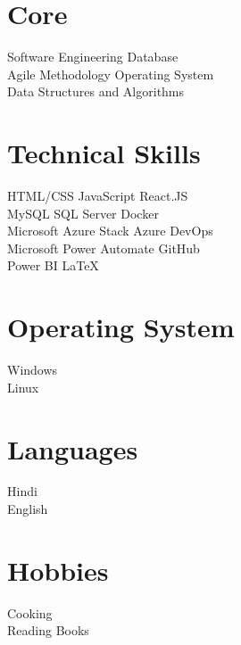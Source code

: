 \documentclass[]{deedy-resume-openfont}
\begin{document}
\begin{minipage}[t]{0.33\textwidth}

\section{Core}
\textbullet{} Software Engineering  \textbullet{} Database\\ \textbullet{}  Agile Methodology  \textbullet{} Operating System\\ \textbullet{} Data Structures and Algorithms
\sectionsep


\section{Technical Skills}
 \textbullet{} HTML/CSS \textbullet{} JavaScript \textbullet{} React.JS \\
 \textbullet{} MySQL \textbullet{} SQL Server \textbullet{} Docker\\
 \textbullet{} Microsoft Azure Stack \textbullet{} Azure DevOps  \\
 \textbullet{} Microsoft Power Automate \textbullet{} GitHub  \\ \textbullet{} Power BI \textbullet{} \LaTeX\
\sectionsep


\section{Operating System}
\textbullet{} Windows \\
\textbullet{} Linux \\ 
\sectionsep


\section{Languages}
\textbullet{} Hindi \\
\textbullet{} English \\ 
\sectionsep


\section{Hobbies}
\textbullet{} Cooking \\
\textbullet{} Reading Books \\ 
\sectionsep

%
%

\end{minipage} 
\end{document}
